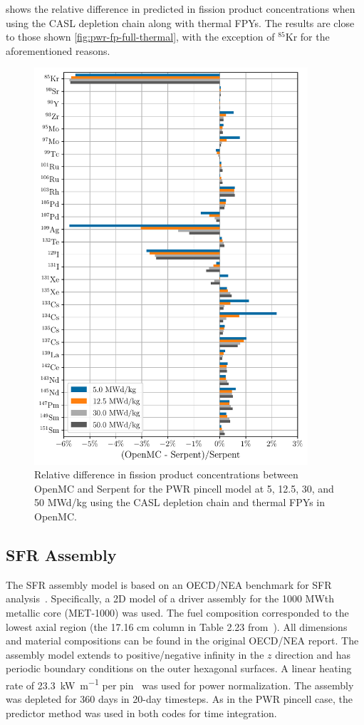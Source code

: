 \documentclass[3p,authoryear]{elsarticle}
\begin{document}
 shows the relative difference in predicted in
fission product concentrations when using the CASL depletion chain along with
thermal FPYs. The results are close to those shown
\cref{fig:pwr-fp-full-thermal}, with the exception of $^{85}$Kr for the
aforementioned reasons.
\begin{figure}[H]
  \centering
  \includegraphics[width=4in]{figures/pwr_fp_casl_thermal.pdf}
  \caption{Relative difference in fission product concentrations between OpenMC
  and Serpent for the PWR pincell model at 5, 12.5, 30, and 50 MWd/kg using the
  CASL depletion chain and thermal FPYs in OpenMC.}
  \label{fig:pwr-fp-casl-thermal}
\end{figure}

\subsection{SFR Assembly}

The SFR assembly model is based on an OECD/NEA benchmark for SFR
analysis~\citep{nsc2015}. Specifically, a 2D model of a driver assembly for the
1000 MWth metallic core (MET-1000) was used. The fuel composition corresponded
to the lowest axial region (the 17.16 cm column in Table 2.23
from~\citep{nsc2015}). All dimensions and material compositions can be found in
the original OECD/NEA report. The assembly model extends to positive/negative
infinity in the $z$ direction and has periodic boundary conditions on the outer
hexagonal surfaces. A linear heating rate of \SI{23.3}{\kilo\watt\per\meter} per
pin~\citep{cahalan2007anl} was used for power normalization. The assembly was
depleted for 360 days in 20-day timesteps. As in the PWR pincell case, the
predictor method was used in both codes for time integration.
\end{document}
